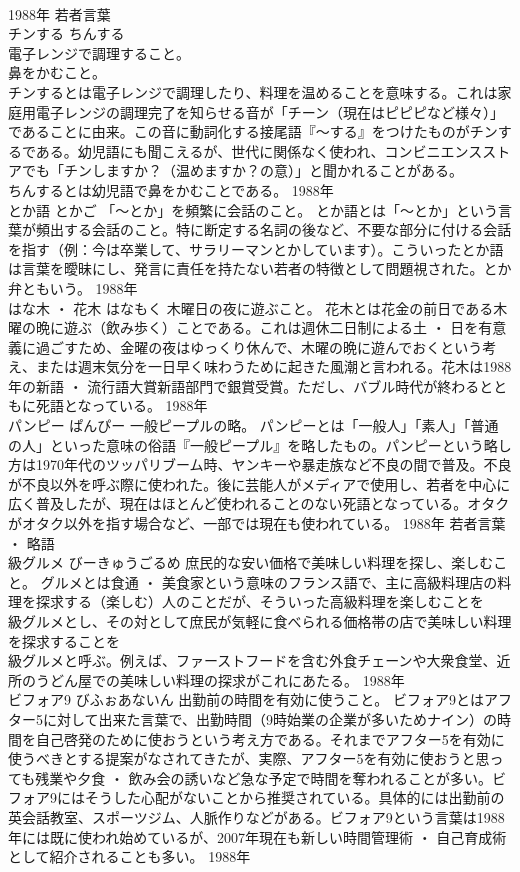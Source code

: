 \documentclass[8pt]{extreport}
\begin{document}
\begin{CJK}{UTF8}{min}
\\	1988年	若者言葉	
\\	チンする	ちんする	
\\	電子レンジで調理すること。 
\\	鼻をかむこと。	
\\	チンするとは電子レンジで調理したり、料理を温めることを意味する。これは家庭用電子レンジの調理完了を知らせる音が「チーン（現在はピピピなど様々）」であることに由来。この音に動詞化する接尾語『～する』をつけたものがチンするである。幼児語にも聞こえるが、世代に関係なく使われ、コンビニエンスストアでも「チンしますか？（温めますか？の意）」と聞かれることがある。 
\\	ちんするとは幼児語で鼻をかむことである。	1988年	
\\	とか語	とかご	「～とか」を頻繁に会話のこと。	とか語とは「～とか」という言葉が頻出する会話のこと。特に断定する名詞の後など、不要な部分に付ける会話を指す（例：今は卒業して、サラリーマンとかしています）。こういったとか語は言葉を曖昧にし、発言に責任を持たない若者の特徴として問題視された。とか弁ともいう。	1988年	
\\	はな木 ・ 花木	はなもく	木曜日の夜に遊ぶこと。	花木とは花金の前日である木曜の晩に遊ぶ（飲み歩く）ことである。これは週休二日制による土 ・ 日を有意義に過ごすため、金曜の夜はゆっくり休んで、木曜の晩に遊んでおくという考え、または週末気分を一日早く味わうために起きた風潮と言われる。花木は1988年の新語 ・ 流行語大賞新語部門で銀賞受賞。ただし、バブル時代が終わるとともに死語となっている。	1988年	
\\	パンピー	ぱんぴー	一般ピープルの略。	パンピーとは「一般人」「素人」「普通の人」といった意味の俗語『一般ピープル』を略したもの。パンピーという略し方は1970年代のツッパリブーム時、ヤンキーや暴走族など不良の間で普及。不良が不良以外を呼ぶ際に使われた。後に芸能人がメディアで使用し、若者を中心に広く普及したが、現在はほとんど使われることのない死語となっている。オタクがオタク以外を指す場合など、一部では現在も使われている。	1988年	若者言葉 ・ 略語	
\\	級グルメ	びーきゅうごるめ	庶民的な安い価格で美味しい料理を探し、楽しむこと。	グルメとは食通 ・ 美食家という意味のフランス語で、主に高級料理店の料理を探求する（楽しむ）人のことだが、そういった高級料理を楽しむことを
\\	級グルメとし、その対として庶民が気軽に食べられる価格帯の店で美味しい料理を探求することを
\\	級グルメと呼ぶ。例えば、ファーストフードを含む外食チェーンや大衆食堂、近所のうどん屋での美味しい料理の探求がこれにあたる。	1988年	
\\	ビフォア9	びふぉあないん	出勤前の時間を有効に使うこと。	ビフォア9とはアフター5に対して出来た言葉で、出勤時間（9時始業の企業が多いためナイン）の時間を自己啓発のために使おうという考え方である。それまでアフター5を有効に使うべきとする提案がなされてきたが、実際、アフター5を有効に使おうと思っても残業や夕食 ・ 飲み会の誘いなど急な予定で時間を奪われることが多い。ビフォア9にはそうした心配がないことから推奨されている。具体的には出勤前の英会話教室、スポーツジム、人脈作りなどがある。ビフォア9という言葉は1988年には既に使われ始めているが、2007年現在も新しい時間管理術 ・ 自己育成術として紹介されることも多い。	1988年	

\end{CJK}
\end{document}
